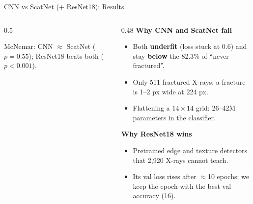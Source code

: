 \documentclass[aspectratio=169,10pt]{beamer}
\begin{document}
\begin{frame}{CNN vs ScatNet (+ ResNet18): Results}
\begin{columns}[T]
\begin{column}{0.5\textwidth}
      \raggedright\small
      McNemar: CNN $\approx$ ScatNet ($p=0.55$); ResNet18 beats both ($p<0.001$).
    \end{column}
    \begin{column}{0.48\textwidth}
      \small
      \textbf{Why CNN and ScatNet fail}
      \begin{itemize}
        \item Both \textbf{underfit} (loss stuck at 0.6) and stay \textbf{below} the 82.3\% of ``never fractured''.
        \item Only 511 fractured X-rays; a fracture is 1--2 px wide at 224 px.
        \item Flattening a $14{\times}14$ grid: 26--42M parameters in the classifier.
      \end{itemize}
      \textbf{Why ResNet18 wins}
      \begin{itemize}
        \item Pretrained edge and texture detectors that 2,920 X-rays cannot teach.
        \item Its val loss rises after $\approx$10 epochs; we keep the epoch with the best val accuracy (16).
      \end{itemize}
    \end{column}
  \end{columns}
\end{frame}
\end{document}
